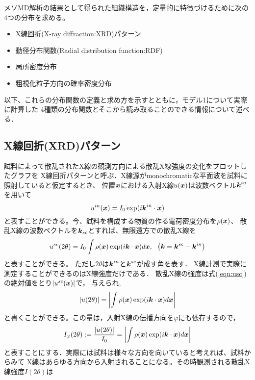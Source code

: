 ﻿メソMD解析の結果として得られた組織構造を，定量的に特徴づけるために次の4つの分布を求める。
\begin{itemize}
	\item X線回折(X-ray diffraction:XRD)パターン
	\item 動径分布関数(Radial distribution function:RDF)
	\item 局所密度分布
	\item 粗視化粒子方向の確率密度分布
\end{itemize}
以下、これらの分布関数の定義と求め方を示すとともに，モデル1について実際に計算した
4種類の分布関数とそこから読み取ることのできる情報について述べる．
\subsection{X線回折(XRD)パターン}
試料によって散乱されたX線の観測方向による散乱X線強度の変化をプロットしたグラフを
X線回折パターンと呼ぶ．X線源がmonochromaticな平面波を試料に照射していると仮定するとき、
位置$\mbox{\boldmath $x$}$における入射X線$u(\mbox{\boldmath $x$})$は波数ベクトル$\mbox{\boldmath $k$}^{in}$を用いて
\begin{equation}
	u^{in}(\mbox{\boldmath $x$})=I_0 \exp(i\mbox{\boldmath $k$}^{in}\cdot\mbox{\boldmath $x$})
	\label{eqn:uin}
\end{equation}
と表すことができる。今、試料を構成する物質の作る電荷密度分布を$\rho(\mbox{\boldmath $x$})$、
散乱X線の波数ベクトルを$\mbox{\boldmath $k$}_{sc}$とすれば、無限遠方での散乱X線を
\begin{equation}
	u^{sc}(2\theta)=I_0 \int \rho(\fat{x})\exp(i\fat{k}\cdot\fat{x})d\fat{x}, \ \ 
	\left(\fat{k}=\fat{k}^{sc}-\fat{k}^{in}\right)
	\label{eqn:usc}
\end{equation}
と表すことができる。
ただし$2\theta$は$\mbox{\boldmath $k$}^{in}$と$\mbox{\boldmath $k$}^{sc}$が成す角を表す．
X線計測で実際に測定することができるのはX線強度だけである．
散乱X線の強度は式(\ref{eqn:usc})の絶対値をとり$\left| u^{sc}(\mbox{\boldmath $x$})\right|$で，
与えられ,
\begin{equation}
	\left|u(2\theta)\right|
	=
	\left|\int \rho(\mbox{\boldmath $x$}) \exp(i\mbox{\boldmath $k$}\cdot \mbox{\boldmath $x$}) d\mbox{\boldmath $x$} \right|
	\label{eqn:I2th_bar}
\end{equation}
と書くことができる。この量は，入射X線の伝播方向を$\varphi$にも依存するので，
\begin{equation}
	I_\varphi(2\theta):
		=\frac{\left|u(2\theta)\right|}{I_0}
		=
	\left|\int \rho(\mbox{\boldmath $x$}) \exp(i\mbox{\boldmath $k$}\cdot \mbox{\boldmath $x$}) d\mbox{\boldmath $x$} \right|
	\label{eqn:Iphi}
\end{equation}
と表すことにする．実際には試料は様々な方向を向いていると考えれば、試料からみて
X線はあらゆる方向から入射されることになる。その時観測される散乱X線強度$I(2\theta)$は
